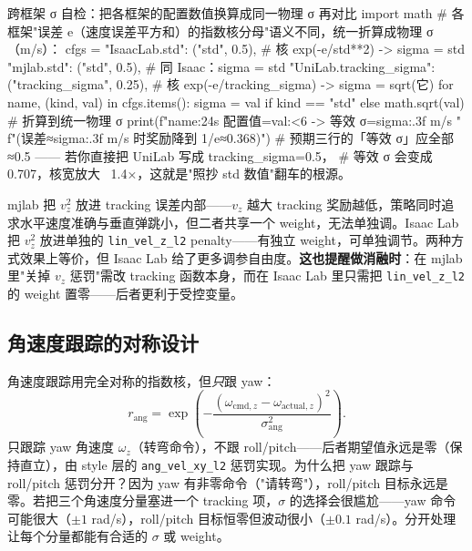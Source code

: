 \begin{codebox}[Python]{跨框架 σ 自检：把各框架的配置数值换算成同一物理 σ 再对比}
import math
# 各框架"误差 e（速度误差平方和）的指数核分母"语义不同，统一折算成物理 σ（m/s）：
cfgs = {
    "IsaacLab.std":        ("std",            0.5),    # 核 exp(-e/std**2)  -> sigma = std
    "mjlab.std":           ("std",            0.5),    # 同 Isaac：sigma = std
    "UniLab.tracking_sigma": ("tracking_sigma", 0.25), # 核 exp(-e/tracking_sigma) -> sigma = sqrt(它)
}
for name, (kind, val) in cfgs.items():
    sigma = val if kind == "std" else math.sqrt(val)   # 折算到统一物理 σ
    print(f"{name:24s} 配置值={val:<6} -> 等效 σ={sigma:.3f} m/s "
          f"(误差≈{sigma:.3f} m/s 时奖励降到 1/e≈0.368)")
# 预期三行的「等效 σ」应全部≈0.5 —— 若你直接把 UniLab 写成 tracking_sigma=0.5，
#   等效 σ 会变成 0.707，核宽放大 ~1.4×，这就是"照抄 std 数值"翻车的根源。
\end{codebox}

\begin{insight}\label{ins:rlmc-rew-vzplace}
mjlab 把 $v_z^2$ 放进 tracking 误差内部——$v_z$ 越大 tracking 奖励越低，策略同时追求水平速度准确与垂直弹跳小，但二者共享一个 weight，无法单独调。Isaac Lab 把 $v_z^2$ 放进单独的 \verb|lin_vel_z_l2| penalty——有独立 weight，可单独调节。两种方式效果上等价，但 Isaac Lab 给了更多调参自由度。\textbf{这也提醒做消融时}：在 mjlab 里"关掉 $v_z$ 惩罚"需改 tracking 函数本身，而在 Isaac Lab 里只需把 \verb|lin_vel_z_l2| 的 weight 置零——后者更利于受控变量。
\end{insight}

\subsection{角速度跟踪的对称设计}
\label{sec:rlmc-rew-angtrack}

角速度跟踪用完全对称的指数核，但\emph{只}跟 yaw：
\begin{equation}
r_{\text{ang}}=\exp\!\left(-\frac{(\omega_{\text{cmd},z}-\omega_{\text{actual},z})^2}{\sigma_{\text{ang}}^2}\right).
\label{eq:rlmc-rew-angexp}
\end{equation}
只跟踪 yaw 角速度 $\omega_z$（转弯命令），不跟 roll/pitch——后者期望值永远是零（保持直立），由 style 层的 \verb|ang_vel_xy_l2| 惩罚实现。为什么把 yaw 跟踪与 roll/pitch 惩罚分开？因为 yaw 有非零命令（"请转弯"），roll/pitch 目标永远是零。若把三个角速度分量塞进一个 tracking 项，$\sigma$ 的选择会很尴尬——yaw 命令可能很大（$\pm1$ rad/s），roll/pitch 目标恒零但波动很小（$\pm0.1$ rad/s）。分开处理让每个分量都能有合适的 $\sigma$ 或 weight。

